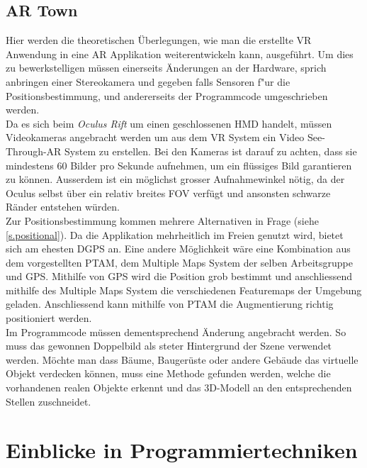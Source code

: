 \section{AR Town}\label{c.artown}
Hier werden die theoretischen Überlegungen, wie man die erstellte VR Anwendung in eine AR Applikation weiterentwickeln kann, ausgeführt. Um dies zu bewerkstelligen müssen einerseits Änderungen an der Hardware, sprich anbringen einer Stereokamera und gegeben falls Sensoren f"ur die Positionsbestimmung, und andererseits der Programmcode umgeschrieben werden.\\[6pt]
Da es sich beim \textit{Oculus Rift} um einen geschlossenen HMD handelt, müssen Videokameras angebracht werden um aus dem VR System ein Video See-Through-AR System zu erstellen. Bei den Kameras ist darauf zu achten, dass sie mindestens 60 Bilder pro Sekunde aufnehmen, um ein flüssiges Bild garantieren zu können. Ausserdem ist ein möglichst grosser Aufnahmewinkel nötig, da der Oculus selbst über ein relativ breites FOV verfügt und ansonsten schwarze Ränder entstehen würden.\cite{website:arrift}\\[6pt]
Zur Positionsbestimmung kommen mehrere Alternativen in Frage (siehe \ref{s.positional}). Da die Applikation mehrheitlich im Freien genutzt wird, bietet sich am ehesten DGPS an. Eine andere Möglichkeit wäre eine Kombination aus dem vorgestellten PTAM, dem Multiple Maps System der selben Arbeitsgruppe\cite{website:multimaps} und GPS. Mithilfe von GPS wird die Position grob bestimmt und anschliessend mithilfe des Multiple Maps System die verschiedenen Featuremaps der Umgebung geladen. Anschliessend kann mithilfe von PTAM die Augmentierung richtig positioniert werden.\\[6pt]
Im Programmcode müssen dementsprechend Änderung angebracht werden. So muss das gewonnen Doppelbild als steter Hintergrund der Szene verwendet werden. Möchte man dass Bäume, Baugerüste oder andere Gebäude das virtuelle Objekt verdecken können, muss eine Methode gefunden werden, welche die vorhandenen realen Objekte erkennt und das 3D-Modell an den entsprechenden Stellen zuschneidet.

\chapter{Einblicke in Programmiertechniken}\label{c.programing}
\vspace{-20pt}
